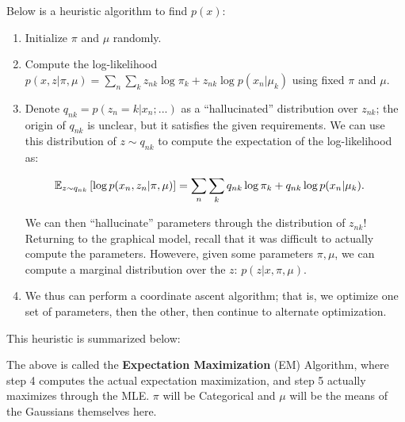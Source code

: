 \documentclass{article}
\begin{document}
Below is a heuristic algorithm to find $p(x)$:
\begin{enumerate}
	\item Initialize $\pi$ and $\mu$ randomly.
	\item Compute the log-likelihood $\displaystyle p(x, z | \pi, \mu) = \sum_n \sum_k z_{nk} \log \pi_k + z_{nk} \log p(x_n |\mu_k)$ using fixed $\pi$ and $\mu$.
	\item Denote $q_{nk} = p(z_n = k | x_n ;... )$ as a ``hallucinated'' distribution over $z_{nk}$; the origin of $q_{nk}$ is unclear, but it satisfies the given requirements.  We can use this distribution of $z \sim q_{nk}$ to compute the expectation of the log-likelihood as:

	\begin{align*}
	\mathbb{E}_{z \sim q_{nk}} \left[ \log p(x_n, z_n | \pi, \mu) \right]	&= \sum_n \sum_k q_{nk} \log \pi_k + q_{nk} \log p(x_n | \mu_k).
	\end{align*}

	We can then ``hallucinate'' parameters through the distribution of $z_{nk}$!  Returning to the graphical model, recall that it was difficult to actually compute the parameters.  Howevere, given some parameters $\pi,\mu$, we can compute a marginal distribution over the $z$: $p(z | x, \pi, \mu)$.

	\item We thus can perform a coordinate ascent algorithm; that is, we optimize one set of parameters, then the other, then continue to alternate optimization.
\end{enumerate}

This heuristic is summarized below:

\begin{algorithm}
\begin{algorithmic}[1]
  \EndWhile{}
  \EndProcedure{}
\end{algorithmic}
\end{algorithm}


The above is called the {\bf Expectation Maximization} (EM) Algorithm, where step 4 computes the actual expectation maximization, and step 5 actually maximizes through the MLE.  $\pi$ will be Categorical and $\mu$ will be the means of the Gaussians themselves here.
\end{document}
